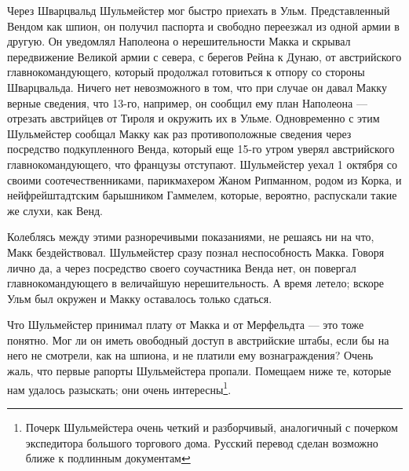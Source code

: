 \documentclass[
  oneside,
  12pt,
  titlepage]{book}
\begin{document}
Через Шварцвальд Шульмейстер мог быстро приехать в Ульм. Представленный Вендом как шпион, он получил паспорта и свободно переезжал из одной армии в другую. Он уведомлял Наполеона о нерешительности Макка и скрывал передвижение Великой армии с севера, с берегов Рейна к Дунаю, от австрийского главнокомандующего, который продолжал готовиться к отпору со стороны Шварцвальда. Ничего нет невозможного в том, что при случае он давал Макку верные сведения, что 13-го, например, он сообщил ему план Наполеона --- отрезать австрийцев от Тироля и окружить их в Ульме. Одновременно с этим Шульмейстер сообщал Макку как раз противоположные сведения через посредство подкупленного Венда, который еще 15-го утром уверял австрийского главнокомандующего, что французы отступают. Шульмейстер уехал 1 октября со своими соотечественниками, парикмахером Жаном Рипманном, родом из Корка, и нейфрейштадтским барышником Гаммелем, которые, вероятно, распускали такие же слухи, как Венд.

Колеблясь между этими разноречивыми показаниями, не решаясь ни на что, Макк бездействовал. Шульмейстер сразу познал неспособность Макка. Говоря лично да, а через посредство своего соучастника Венда нет, он повергал главнокомандующего в величайшую нерешительность. А время летело; вскоре Ульм был окружен и Макку оставалось только сдаться.

Что Шульмейстер принимал плату от Макка и от Мерфельдта --- это тоже понятно. Мог ли он иметь овободный доступ в австрийские штабы, если бы на него не смотрели, как на шпиона, и не платили ему вознаграждения? Очень жаль, что первые рапорты Шульмейстера пропали. Помещаем ниже те, которые нам удалось разыскать; они очень интересны\footnote{Почерк Шульмейстера очень четкий и разборчивый, аналогичный с почерком экспедитора большого торгового дома. Русский перевод сделан возможно ближе к подлинным документам}.
\end{document}
